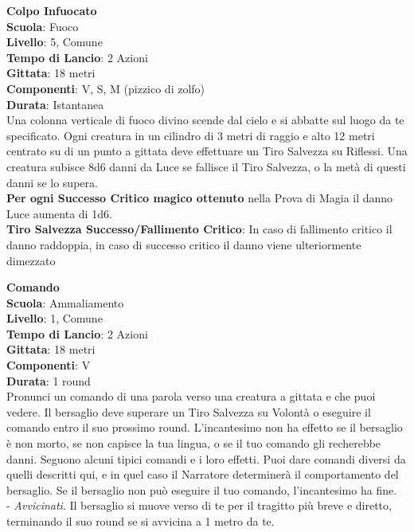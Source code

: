 \begin{multicols}{2}
\medskip\textbf{Colpo Infuocato}\\
\textbf{Scuola}: Fuoco\\
\textbf{Livello}: 5, Comune\\
\textbf{Tempo di Lancio}: 2 Azioni\\
\textbf{Gittata}: 18 metri\\
\textbf{Componenti}: V, S, M (pizzico di zolfo)\\
\textbf{Durata}: Istantanea\\
Una colonna verticale di fuoco divino scende dal cielo e si abbatte sul luogo da te specificato. Ogni creatura in un cilindro di 3 metri di raggio e alto 12 metri centrato su di un punto a gittata deve effettuare un Tiro Salvezza su Riflessi. Una creatura subisce 8d6 danni da Luce se fallisce il Tiro Salvezza, o la metà di questi danni se lo supera.\\
\textbf{Per ogni Successo Critico magico ottenuto} nella Prova di Magia il danno Luce aumenta di 1d6.\\
\textbf{Tiro Salvezza Successo/Fallimento Critico}: In caso di fallimento critico il danno raddoppia, in caso di successo critico il danno viene ulteriormente dimezzato

\medskip\textbf{Comando}\\
\textbf{Scuola}: Ammaliamento\\
\textbf{Livello}: 1, Comune\\
\textbf{Tempo di Lancio}: 2 Azioni\\
\textbf{Gittata}: 18 metri\\
\textbf{Componenti}: V\\
\textbf{Durata}: 1 round\\
Pronunci un comando di una parola verso una creatura a gittata e che puoi vedere. Il bersaglio deve superare un Tiro Salvezza su Volontà o eseguire il comando entro il suo prossimo round. L'incantesimo non ha effetto se il bersaglio è non morto, se non capisce la tua lingua, o se il tuo comando gli recherebbe danni. Seguono alcuni tipici comandi e i loro effetti. Puoi dare comandi diversi da quelli descritti qui, e in quel caso il Narratore determinerà il comportamento del bersaglio. Se il bersaglio non può eseguire il tuo comando, l'incantesimo ha fine.\\

- \textit{Avvicinati}. Il bersaglio si muove verso di te per il tragitto più breve e diretto, terminando il suo round se si avvicina a 1 metro da te.\\


\end{multicols}
